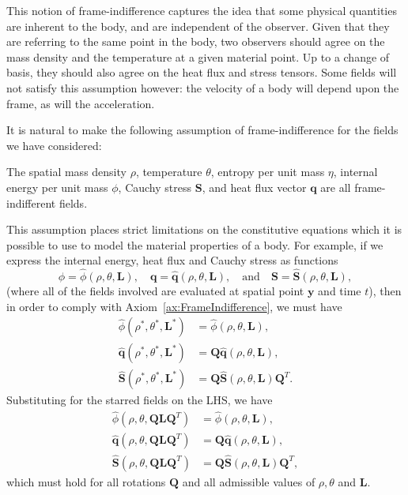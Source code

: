 \documentclass[
  letterpaper,
  DIV=11,
  numbers=noendperiod]{scrreprt}
\theoremstyle{plain}
\theoremstyle{remark}
\begin{document}
This notion of frame-indifference captures the idea that some physical
quantities are inherent to the body, and are independent of the
observer. Given that they are referring to the same point in the body,
two observers should agree on the mass density and the temperature at a
given material point. Up to a change of basis, they should also agree on
the heat flux and stress tensors. Some fields will not satisfy this
assumption however: the velocity of a body will depend upon the frame,
as will the acceleration.

It is natural to make the following assumption of frame-indifference for
the fields we have considered:

\label{ax:FrameIndifference}{} The spatial mass density
\(\rho\), temperature \(\theta\), entropy per unit mass \(\eta\),
internal energy per unit mass \(\phi\), Cauchy stress
\({\boldsymbol{S}}\), and heat flux vector \({\boldsymbol{q}}\) are all
frame-indifferent fields.

This assumption places strict limitations on the constitutive equations
which it is possible to use to model the material properties of a body.
For example, if we express the internal energy, heat flux and Cauchy
stress as functions
\[\phi = \widehat{\phi}(\rho,\theta,{\boldsymbol{L}}),\quad
  {\boldsymbol{q}}= \widehat{{\boldsymbol{q}}}(\rho,\theta,{\boldsymbol{L}}),\quad\text{and}\quad
  {\boldsymbol{S}}= \widehat{{\boldsymbol{S}}}(\rho,\theta,{\boldsymbol{L}}),\]
(where all of the fields involved are evaluated at spatial point
\({\boldsymbol{y}}\) and time \(t\)), then in order to comply with
Axiom~\hyperref[ax:FrameIndifference]{{[}ax:FrameIndifference{]}}, we
must have \[\begin{aligned}
  \widehat{\phi}(\rho^*,\theta^*,{\boldsymbol{L}}^*) &= \widehat{\phi}(\rho,\theta,{\boldsymbol{L}}),\\
  \widehat{{\boldsymbol{q}}}(\rho^*,\theta^*,{\boldsymbol{L}}^*) &= {\boldsymbol{Q}}\widehat{{\boldsymbol{q}}}(\rho,\theta,{\boldsymbol{L}}),\\
  \widehat{{\boldsymbol{S}}}(\rho^*,\theta^*,{\boldsymbol{L}}^*) &= {\boldsymbol{Q}}\widehat{{\boldsymbol{S}}}(\rho,\theta,{\boldsymbol{L}}){\boldsymbol{Q}}^T.
\end{aligned}\] Substituting for the starred fields on the LHS, we have
\[\begin{aligned}
  \widehat{\phi}(\rho,\theta,{\boldsymbol{Q}}{\boldsymbol{L}}{\boldsymbol{Q}}^T) &= \widehat{\phi}(\rho,\theta,{\boldsymbol{L}}),\\
  \widehat{{\boldsymbol{q}}}(\rho,\theta,{\boldsymbol{Q}}{\boldsymbol{L}}{\boldsymbol{Q}}^T) &= {\boldsymbol{Q}}\widehat{{\boldsymbol{q}}}(\rho,\theta,{\boldsymbol{L}}),\\
  \widehat{{\boldsymbol{S}}}(\rho,\theta,{\boldsymbol{Q}}{\boldsymbol{L}}{\boldsymbol{Q}}^T) &= {\boldsymbol{Q}}\widehat{{\boldsymbol{S}}}(\rho,\theta,{\boldsymbol{L}}){\boldsymbol{Q}}^T,
\end{aligned}\] which must hold for all rotations \({\boldsymbol{Q}}\)
and all admissible values of \(\rho, \theta\) and \({\boldsymbol{L}}\).
\end{document}

